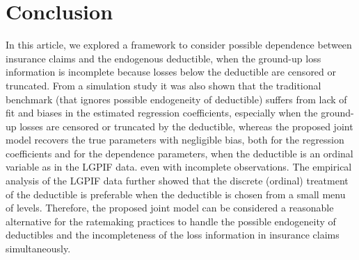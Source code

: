 \documentclass[11pt]{article}
\newcommand{\rev}[1]{{\color{blue}#1}}
\begin{document}
{%

\FloatBarrier

\section{Conclusion}

In this article, we explored a framework to consider possible dependence between insurance claims and the endogenous deductible, \rev{when the ground-up loss information is incomplete because losses below the deductible are censored or truncated}. From a simulation study it was also shown that the traditional benchmark (that ignores possible endogeneity of deductible) suffers from lack of fit and biases in the estimated regression coefficients, especially when the \rev{ground-up losses are censored or truncated by the deductible,} whereas the proposed joint model \rev{recovers the true parameters with negligible bias}\rev{, both for the regression coefficients and for the dependence parameters, when the deductible is an ordinal variable as in the LGPIF data}. even with incomplete observations. \rev{The empirical analysis of the LGPIF data further showed that the discrete (ordinal) treatment of the deductible is preferable when the deductible is chosen from a small menu of levels.} Therefore, the proposed joint model can be considered a reasonable alternative for the ratemaking practices to handle the possible endogeneity of deductibles and \rev{the incompleteness of the loss information} in insurance claims simultaneously.

}
\end{document}
